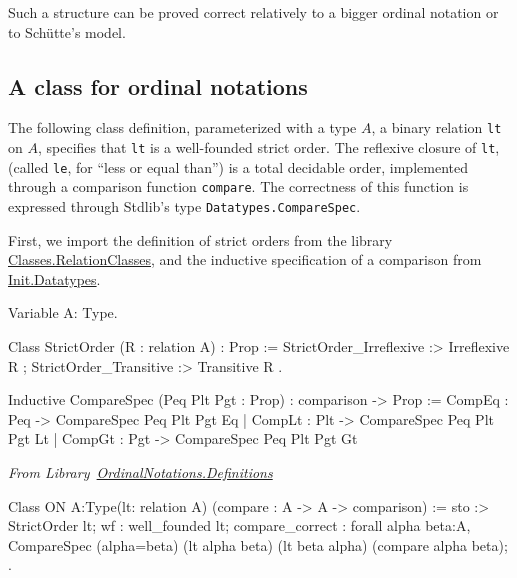Such a structure can be proved correct relatively to a bigger ordinal notation or
to Schütte's model.





\subsection{A class for ordinal notations}

The following class definition, parameterized with a type $A$, a binary relation \texttt{lt} on $A$, specifies that \texttt{lt} is a well-founded strict order. The reflexive closure of \texttt{lt}, (called \texttt{le}, for ``less  or equal than'') is a total decidable order, implemented through a comparison function \texttt{compare}.  The correctness of this function is expressed through Stdlib's type 
\texttt{Datatypes.CompareSpec}.

First, we import the definition of strict orders from
the library ~\href{https://coq.inria.fr/distrib/current/stdlib/Coq.Classes.RelationClasses.html}{%
Classes.RelationClasses}, 
and the inductive specification of a comparison from
\href{https://coq.inria.fr/distrib/current/stdlib/Coq.Init.Datatypes.html}{%
Init.Datatypes}.

\begin{Coqsrc}
Variable A: Type.

  Class StrictOrder (R : relation A) : Prop := {
    StrictOrder_Irreflexive :> Irreflexive R ;
    StrictOrder_Transitive :> Transitive R }.
\end{Coqsrc}


\begin{Coqsrc}
Inductive CompareSpec (Peq Plt Pgt : Prop) : comparison -> Prop :=
    CompEq : Peq -> CompareSpec Peq Plt Pgt Eq
  | CompLt : Plt -> CompareSpec Peq Plt Pgt Lt
  | CompGt : Pgt -> CompareSpec Peq Plt Pgt Gt
\end{Coqsrc}

\vspace{4pt}
\noindent\emph{From Library~\href{../theories/html/hydras.OrdinalNotations.Definitions.html}{OrdinalNotations.Definitions}}

\label{types:ON}

\begin{Coqsrc}
Class ON {A:Type}(lt: relation A)
      (compare : A -> A -> comparison)  :=
  {
  sto :> StrictOrder lt;
  wf : well_founded lt;
  compare_correct :
    forall alpha beta:A,
      CompareSpec (alpha=beta) (lt alpha beta) (lt beta alpha)
                  (compare alpha beta);
  }.
\end{Coqsrc}

